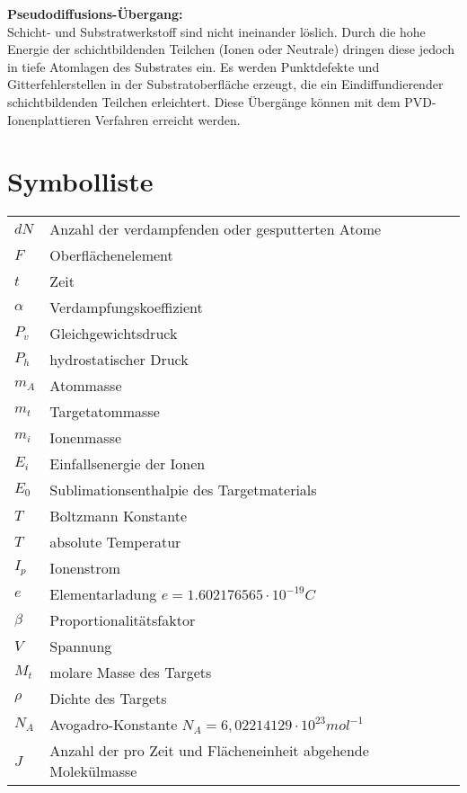 \documentclass[12pt,a4paper,bibliography=totocnumbered,listof=totocnumbered,fleqn]{scrartcl}
\begin{document}
\textbf{Pseudodiffusions-Übergang:}\\
Schicht- und Substratwerkstoff sind nicht ineinander löslich.
Durch die hohe Energie der schichtbildenden Teilchen (Ionen oder Neutrale) dringen diese jedoch in tiefe Atomlagen des Substrates ein.
Es werden Punktdefekte und Gitterfehlerstellen in der Substratoberfläche erzeugt, die ein Eindiffundierender schichtbildenden Teilchen erleichtert.
Diese Übergänge können mit dem PVD-Ionenplattieren Verfahren erreicht werden.

\pagebreak
\renewcommand\refname{Quellenverzeichnis}
\nocite{*}


\newpage
\setcounter{page}{1}

\section*{Symbolliste}
\begin{tabular}{ll}
$dN$ & Anzahl der verdampfenden oder gesputterten Atome\\
$F$ & Oberflächenelement\\
$t$ & Zeit\\
$\alpha$ & Verdampfungskoeffizient\\
$P_{v}$ & Gleichgewichtsdruck\\
$P_{h}$ & hydrostatischer Druck\\
$m_{A}$  & Atommasse\\
$m_{t}$ & Targetatommasse\\
$m_{i}$ & Ionenmasse\\
$E_{i}$ & Einfallsenergie der Ionen\\
$E_{0}$ & Sublimationsenthalpie des Targetmaterials\\
$T$ & Boltzmann Konstante\\
$T$ & absolute Temperatur\\
$I_{p}$  & Ionenstrom\\
$e$ & Elementarladung $e=1.602176565\cdot 10^{-19}C$\\
$\beta$ & Proportionalitätsfaktor\\
$V$ & Spannung\\
$M_{t}$ & molare Masse des Targets\\
$\rho$ & Dichte des Targets\\
$N_{A}$ & Avogadro-Konstante $N_{A}=6,02214129\cdot 10^{23}mol^{-1}$\\
$J$	&	Anzahl der pro Zeit und Flächeneinheit abgehende Molekülmasse
\end{tabular}
\end{document}
